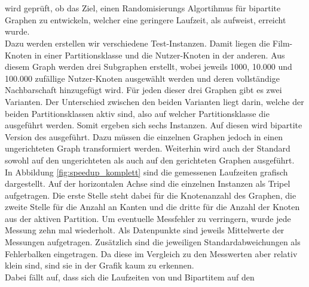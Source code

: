 

\section{}
 wird geprüft, ob das Ziel, einen Randomisierungs Algortihmus 
für bipartite Graphen zu entwickeln, welcher eine geringere Laufzeit, als \gc{} aufweist, erreicht wurde.
\\
Dazu werden erstellen wir verschiedene Test-Instanzen.
 Damit liegen die Film-Knoten in einer Partitionsklasse und 
die Nutzer-Knoten in der anderen.
Aus diesem Graph werden drei Subgraphen erstellt, wobei jeweils 1000, 10.000 und 100.000  zufällige
Nutzer-Knoten ausgewählt werden und deren vollständige Nachbarschaft hinzugefügt wird.
Für jeden dieser drei Graphen gibt es zwei Varianten. Der Unterschied
zwischen den beiden Varianten liegt darin, welche der beiden Partitionsklassen aktiv sind, 
also auf welcher Partitionsklasse die  ausgeführt werden.
Somit ergeben sich sechs Instanzen. Auf diesen wird 
 bipartite Version des \gc{} ausgeführt. Dazu müssen die
einzelnen Graphen jedoch in einen ungerichteten Graph transformiert werden.
Weiterhin wird auch der Standard  
sowohl auf den ungerichteten als auch auf den gerichteten Graphen ausgeführt.
\\
In Abbildung \ref{fig:speedup_komplett} sind die gemessenen Laufzeiten grafisch dargestellt.
Auf der horizontalen Achse sind die einzelnen Instanzen als Tripel aufgetragen.
Die erste Stelle steht dabei für die Knotenanzahl des Graphen, 
die zweite Stelle für die Anzahl an Kanten und die dritte für die Anzahl der Knoten aus 
der aktiven Partition. Um eventuelle Messfehler zu verringern, wurde jede Messung zehn mal 
wiederholt. Als Datenpunkte sind jeweils Mittelwerte der Messungen aufgetragen.
Zusätzlich sind die jeweiligen Standardabweichungen als Fehlerbalken eingetragen. Da
diese im Vergleich zu den Messwerten aber relativ klein sind, sind sie in der Grafik kaum zu erkennen.
\\
Dabei fällt auf, dass sich die Laufzeiten von \cb{} und Bipartitem \gc{} auf den

